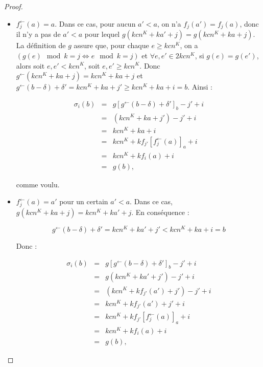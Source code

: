 \documentclass{article}
\newcommand{\eqpred}[3]{#1\left[ #2^{\leftarrow}(#3) \right]_{#3}}
\newcommand{\eqpredfi}[5]{#1\left[ #2^{\leftarrow}(#3) #4 \right]_{#5}} %
\begin{document}
\begin{proof}
\begin{enumerate}[itemsep=-1mm,leftmargin=2cm]
\begin{itemize}[itemsep=-1mm, leftmargin=1cm]
							\begin{itemize}[itemsep=-1mm,leftmargin=1cm]
								\item
									$f_j^{\leftarrow}(a) = a$.   Dans ce cas, pour aucun $a' < a$, on n'a $f_j(a') = f_j(a)$, donc il n'y a pas de $a' < a$ pour lequel $g\left( kcn^K + ka' + j \right) = g\left( kcn^K + ka + j \right)$. La définition de $g$ assure que, pour chaque $e \geqslant kcn^K$, on a $\left(g(e) \mod{k} = j \Leftrightarrow e \mod{k} = j\right)$ et $\forall e, e' \in 2kcn^K$, si $g(e) = g(e')$, alors soit $e, e' < kcn^K$, soit $e, e' \geqslant kcn^K$. Donc $g^{\leftarrow} \left( kcn^K + ka + j \right) = kcn^K + ka + j$ et $g^{\leftarrow}\left( b - \delta \right) + \delta' = kcn^K + ka + j' \geqslant kcn^K + ka + i = b$. Ainsi :
									
									\setcounter{equation}{0}
									\begin{eqnarray}
										\sigma_i(b) 	& = &	\eqpredfi{g}{g}{b-\delta}{+\delta'}{b} - j' + i \\
														& = & 	\left( kcn^K + ka + j' \right) - j' + i \\
														& = & 	kcn^K + ka + i \\
														& = & 	kcn^K + k \eqpred{f_{j'}}{f_j}{a} + i \\
														& = & 	kcn^K + k f_i(a) + i \\
														& = & 	g(b),
									\end{eqnarray}
									
									comme voulu.
									
								\item
									$f_j^{\leftarrow}(a) = a'$ pour un certain $a' < a$. Dans ce cas, $g\left( kcn^K + ka + j \right) = kcn^K + ka' + j$. En conséquence : 
									
									\[
										g^{\leftarrow}\left( b - \delta \right) + \delta' = kcn^K + ka' + j' < kcn^K + ka + i = b
									\]
									
									Donc :
									
									\setcounter{equation}{0}
									\begin{eqnarray}
										\sigma_i(b) 	& = &	\eqpredfi{g}{g}{b-\delta}{+\delta'}{b} - j' + i \\
														& = & 	g\left( kcn^K + ka' + j' \right) - j' + i \\
														& = & 	\left( kcn^K + k f_{j'}(a') + j' \right) - j' + i \\
														& = & 	kcn^K + k f_{j'}(a') + j' + i \\
														& = & 	kcn^K + k \eqpred{f_{j'}}{f_j}{a} + i \\
														& = & 	kcn^K + k f_i(a) + i \\
														& = & 	g(b),
									\end{eqnarray}
									

\end{itemize}
\end{itemize}
\end{enumerate}
\end{proof}
\end{document}
